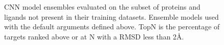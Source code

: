 \documentclass[linenumbers,doublespacing]{bmcart}
\begin{document}
\begin{figure}[tb]
	\caption{CNN model ensembles evaluated on the subset of proteins and ligands not present in their training datasets. Ensemble models used with the default arguments defined above. TopN is the percentage of targets ranked above or at N with a RMSD less than 2{\AA}.}
	\label{fig:No2017NoCD20}
\end{figure}  
\end{document}
